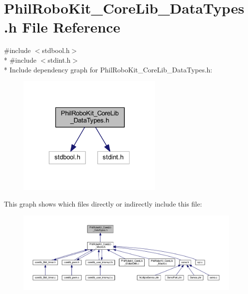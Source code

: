 \section{Phil\-Robo\-Kit\-\_\-\-Core\-Lib\-\_\-\-Data\-Types.\-h File Reference}
\label{_phil_robo_kit___core_lib___data_types_8h}
{\ttfamily \#include $<$stdbool.\-h$>$}\\*
{\ttfamily \#include $<$stdint.\-h$>$}\\*
Include dependency graph for Phil\-Robo\-Kit\-\_\-\-Core\-Lib\-\_\-\-Data\-Types.\-h\-:\nopagebreak
\begin{figure}[H]
\begin{center}
\leavevmode
\includegraphics[width=203pt]{_phil_robo_kit___core_lib___data_types_8h__incl}
\end{center}
\end{figure}
This graph shows which files directly or indirectly include this file\-:\nopagebreak
\begin{figure}[H]
\begin{center}
\leavevmode
\includegraphics[width=350pt]{_phil_robo_kit___core_lib___data_types_8h__dep__incl}
\end{center}
\end{figure}

